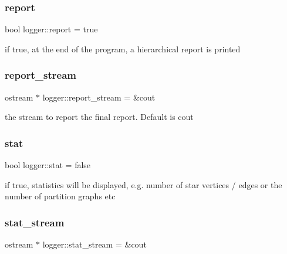 \subsubsection{\texorpdfstring{report}{report}}
{\footnotesize\ttfamily bool logger\+::report = true\hspace{0.3cm}{\ttfamily [static]}}



if true, at the end of the program, a hierarchical report is printed 

\mbox{\label{classlogger_a8e3da449edb99f9ecc59858c0e75beca}} 
\subsubsection{\texorpdfstring{report\+\_\+stream}{report\_stream}}
{\footnotesize\ttfamily ostream $\ast$ logger\+::report\+\_\+stream = \&cout\hspace{0.3cm}{\ttfamily [static]}}



the stream to report the final report. Default is cout 

\mbox{\label{classlogger_a26812b5ba03f130e8dae3446d5fc032f}} 
\subsubsection{\texorpdfstring{stat}{stat}}
{\footnotesize\ttfamily bool logger\+::stat = false\hspace{0.3cm}{\ttfamily [static]}}



if true, statistics will be displayed, e.\+g. number of star vertices / edges or the number of partition graphs etc 

\mbox{\label{classlogger_a7db37821f875f2ba3540980b355779f5}} 
\subsubsection{\texorpdfstring{stat\+\_\+stream}{stat\_stream}}
{\footnotesize\ttfamily ostream $\ast$ logger\+::stat\+\_\+stream = \&cout\hspace{0.3cm}{\ttfamily [static]}}



